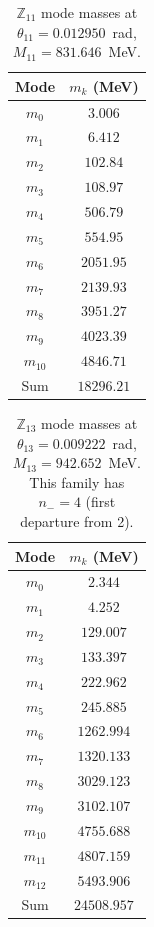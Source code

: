 \documentclass[11pt]{article}
\begin{document}
\begin{table}[ht]
  \caption{$\mathbb{Z}_{11}$ mode masses at $\theta_{11} = 0.012950$~rad,
    $M_{11} = 831.646$~MeV.}
  \label{tab:Z11_masses}
  \begin{tabular}{cc}
    \toprule
    Mode & $m_k$ (MeV) \\
    \midrule
    $m_0$ & $3.006$ \\
    $m_1$ & $6.412$ \\
    $m_2$ & $102.84$ \\
    $m_3$ & $108.97$ \\
    $m_4$ & $506.79$ \\
    $m_5$ & $554.95$ \\
    $m_6$ & $2051.95$ \\
    $m_7$ & $2139.93$ \\
    $m_8$ & $3951.27$ \\
    $m_9$ & $4023.39$ \\
    $m_{10}$ & $4846.71$ \\
    \midrule
    Sum & $18296.21$ \\
    \bottomrule
  \end{tabular}
\end{table}

\begin{table}[ht]
  \caption{$\mathbb{Z}_{13}$ mode masses at $\theta_{13} = 0.009222$~rad,
    $M_{13} = 942.652$~MeV. This family has $n_- = 4$ (first departure from 2).}
  \label{tab:Z13_masses}
  \begin{tabular}{cc}
    \toprule
    Mode & $m_k$ (MeV) \\
    \midrule
    $m_0$ & $2.344$ \\
    $m_1$ & $4.252$ \\
    $m_2$ & $129.007$ \\
    $m_3$ & $133.397$ \\
    $m_4$ & $222.962$ \\
    $m_5$ & $245.885$ \\
    $m_6$ & $1262.994$ \\
    $m_7$ & $1320.133$ \\
    $m_8$ & $3029.123$ \\
    $m_9$ & $3102.107$ \\
    $m_{10}$ & $4755.688$ \\
    $m_{11}$ & $4807.159$ \\
    $m_{12}$ & $5493.906$ \\
    \midrule
    Sum & $24508.957$ \\
    \bottomrule
  \end{tabular}
\end{table}
\end{document}
